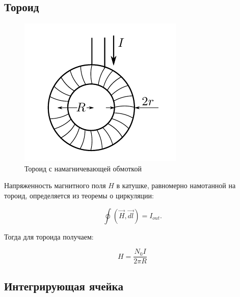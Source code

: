 \subsection*{Тороид}

\begin{figure}
	\vspace{-30pt}
	\includegraphics[width=\linewidth]{../res/tor.png}
	\caption{Тороид с намагничевающей обмоткой}
	\label{img:tor}
	\vspace{30pt}
\end{figure}

Напряженность магнитного поля $H$ в катушке, равномерно намотанной на тороид, определяется из теоремы о циркуляции:

$$ \oint (\vec{H}, \vec{dl}) = I_{out}. $$

Тогда для тороида получаем:

\begin{equation}
	H = \frac{N_0 I}{2 \pi R}
	\label{eq:H_tor}
\end{equation}

\subsection*{Интегрирующая ячейка}

